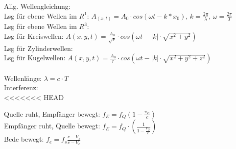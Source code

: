 \documentclass[A4]{scrreprt}
\begin{document}
  
  Allg. Wellengleichung:\\
  Lsg für ebene Wellen im $R^1$: $A_{(x,t)} = A_0\cdot cos(\omega t - k*x_0)$, $k = \frac{2\pi}{\lambda}$, $\omega = \frac{2\pi}{T}$\\
  Lsg für ebene Wellen im $R^3$: \\
  Lsg für Kreiswellen: $A(x,y,t) = \frac{A_0}{\sqrt{r}}\cdot cos(\omega t - |k|\cdot\sqrt{x^2+y^2})$\\
  Lsg für Zylinderwellen: \\
  Lsg für Kugelwellen: $A(x,y,t) = \frac{A_0}{r}\cdot cos(\omega t - |k|\cdot \sqrt{x^2+y^2+z^2})$\\
  \\
  Wellenlänge: $\lambda = c\cdot T$\\  

  Interferenz:\\
<<<<<<< HEAD

  Quelle ruht, Empfänger bewegt: $f_E = f_Q (1-\frac{v_E}{c})$\\
  Empfänger ruht, Quelle bewegt: $f_E = f_Q\cdot(\frac{1}{1-\frac{V_Q}{c}})$\\
  Bede bewegt: $f_e=f_s\frac{c-{V_s}}{c-{V_e}}$

  \addsec{}
\end{document}
